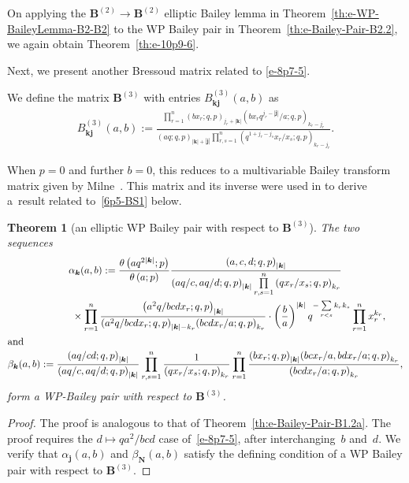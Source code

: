 \documentclass[pdftex]{sigma}
\numberwithin{equation}{section}
\newtheorem{Theorem}{Theorem}[section]
\newenvironment{Remark*}{\begin{remark*}\normalfont}{\end{remark*}}
\newcommand\sumj{{\left| \boldsymbol {j} \right|}}
\newcommand\sumk{{\left| \boldsymbol{k} \right|}}
\newcommand{\B}{{ \mathbf B}}
\newcommand{\N}{{ \boldsymbol N}}
\renewcommand{\k}{{ \boldsymbol{k}}}
\renewcommand{\j}{{ \boldsymbol{j}}}
\newcommand{\sqprod}[1]{\prod\limits_{r, s =1}^{#1}} %
\newcommand{\smallprod}[1]{\prod\limits_{r =1}^{#1}} %
\newcommand{\xover}[1]{#1_{r}/#1_{s}}
\newcommand{\ellipticqrfac}[2]{{\left({#1}; q, p\right)_{#2}}} %
\newcommand{\elliptictheta}[1]{\theta \left({#1} ; p\right) }
\begin{document}
On applying the $\B^{(2)} \to\B^{(2)}$ elliptic Bailey lemma in Theorem~\ref{th:e-WP-BaileyLemma-B2-B2} to the WP Bailey pair in Theorem~\ref{th:e-Bailey-Pair-B2.2}, we again obtain Theorem~\ref{th:e-10p9-6}.

Next, we present another Bressoud matrix related to \eqref{e-8p7-5}.

\begin{Definition} We define the matrix $\B^{(3)}$ with entries $B^{(3)}_{\k\j}(a,b)$ as
\begin{gather}
B^{(3)}_{\k\j}(a,b) := \frac{ \smallprod n \ellipticqrfac{bx_r}{j_r+\sumk} \ellipticqrfac{bx_r q^{j_r-\sumj}/a}{k_r-j_r} }
{ \ellipticqrfac{aq}{\sumk+\sumj} \sqprod n \ellipticqrfac{q^{1+j_r-j_s}\xover x }{k_r-j_r} }. \label{e-B3}
 \end{gather}
\end{Definition}
\begin{Remark*} When $p=0$ and further $b=0$, this reduces to a multivariable Bailey transform matrix given by Milne~\cite[Definition~8.24]{Milne1997}. This matrix and its inverse were used in \cite{GB1995} to derive a~result related to~\eqref{6p5-BS1} below.
\end{Remark*}

\begin{Theorem}[an elliptic WP Bailey pair with respect to $\B^{(3)}$]\label{th:e-Bailey-Pair-B3.2} The two sequences
\begin{gather*}
\alpha_\k(a,b) := \frac{\elliptictheta{aq^{2\sumk}}}{\elliptictheta{a}} \frac{ \ellipticqrfac{a,c, d}{\sumk} }{\ellipticqrfac{aq/c, aq/d}{\sumk}
\sqprod n \ellipticqrfac{q\xover x}{k_r}}\notag\\
\hphantom{\alpha_\k(a,b) :=}{}
\times \smallprod n \frac{\ellipticqrfac{a^2q/bcdx_r}{\sumk}}
{\ellipticqrfac{a^2q/bcdx_r}{\sumk-k_r}\ellipticqrfac{bcdx_r/a}{k_r}}\cdot
\left( \frac{b}{a}\right)^{\sumk}
q^{-\sum\limits_{r<s} k_rk_s}
\smallprod n x_r^{k_r}, \\
 \intertext{and}
\beta_\k(a,b) := \frac{ \ellipticqrfac{aq/cd}{\sumk} }{\ellipticqrfac{aq/c, aq/d}{\sumk}}
\sqprod n\frac{1}{\ellipticqrfac{q\xover x}{k_r}} \smallprod n \frac{\ellipticqrfac{bx_r}{\sumk}\ellipticqrfac{bcx_r/a, bdx_r/a}{k_r}}
{\ellipticqrfac{bcdx_r/a}{k_r}},%
\end{gather*}
form a WP-Bailey pair with respect to $\B^{(3)}$.
\end{Theorem}
\begin{proof} The proof is analogous to that of Theorem~\ref{th:e-Bailey-Pair-B1.2a}. The proof requires the $d\mapsto qa^2/bcd$ case of~\eqref{e-8p7-5}, after interchanging~$b$ and~$d$. We verify that $\alpha_\j(a,b)$ and $\beta_\N(a,b)$ satisfy the defining condition of a WP Bailey pair with respect to $\B^{(3)}$.
\end{proof}
\end{document}
